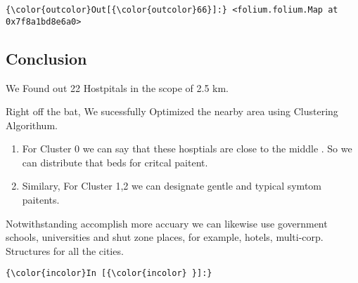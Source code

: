 \documentclass[11pt]{article}
\begin{document}
\begin{Verbatim}[commandchars=\\\{\}]
{\color{outcolor}Out[{\color{outcolor}66}]:} <folium.folium.Map at 0x7f8a1bd8e6a0>
\end{Verbatim}
            
    \subsection{Conclusion}\label{conclusion}

    We Found out 22 Hostpitals in the scope of 2.5 km.

Right off the bat, We sucessfully Optimized the nearby area using
Clustering Algorithum.

\begin{enumerate}
\def\labelenumi{\arabic{enumi}.}
\item
  For Cluster 0 we can say that these hosptials are close to the middle
  . So we can distribute that beds for critcal paitent.
\item
  Similary, For Cluster 1,2 we can designate gentle and typical symtom
  paitents.
\end{enumerate}

Notwithstanding accomplish more accuary we can likewise use government
schools, universities and shut zone places, for example, hotels,
multi-corp. Structures for all the cities.

    \begin{Verbatim}[commandchars=\\\{\}]
{\color{incolor}In [{\color{incolor} }]:} 
\end{Verbatim}


    
    
    
    
\end{document}
